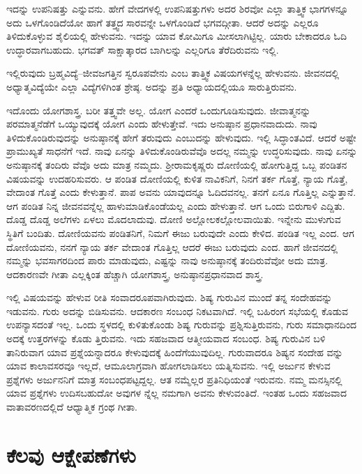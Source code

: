 ಇದನ್ನು ಉಪನಿಷತ್ತು ಎನ್ನುವನು. ಹೇಗೆ ವೇದಗಳಲ್ಲಿ ಉಪನಿಷತ್ತುಗಳು ಅದರ ಶಿರವೋ ಎಲ್ಲಾ ತಾತ್ತ್ವಿಕ ಭಾಗಗಳನ್ನೂ ಅದು ಒಳಗೊಂಡಿದೆಯೋ ಹಾಗೆ ತತ್ತ್ವದ ಸಾರವನ್ನೇ ಒಳಗೊಂಡಿದೆ ಭಗವದ್ಗೀತಾ. ಆದರೆ ಅದನ್ನು ಎಲ್ಲರೂ ತಿಳಿದುಕೊಳ್ಳುವ ಶೈಲಿಯಲ್ಲಿ ಹೇಳುವನು. ಇದನ್ನು ಯಾವ ಕೋಮಿಗೂ ಮೀಸಲಾಗಿಟ್ಟಿಲ್ಲ. ಯಾರು ಬೇಕಾದರೂ ಓದಿ ಉದ್ಧಾರವಾಗಬಹುದು. ಭಗವತ್ ಸಾಕ್ಷಾತ್ಕಾರದ ಬಾಗಿಲನ್ನು ಎಲ್ಲರಿಗೂ ತೆರೆದಿರುವನು ಇಲ್ಲಿ.

ಇಲ್ಲಿರುವುದು ಬ್ರಹ್ಮವಿದ್ಯೆ–ಜೀವಜಗತ್ತಿನ ಸ್ವರೂಪವೇನು ಎಂಬ ತಾತ್ತ್ವಿಕ ವಿಷಯಗಳನ್ನೆಲ್ಲ ಹೇಳುವನು. ಜೀವನದಲ್ಲಿ ಅಧ್ಯಾತ್ಮವಿದ್ಯೆಯೇ ಎಲ್ಲಾ ವಿದ್ಯೆಗಳಿಗಿಂತ ಶ್ರೇಷ್ಠ. ಅದನ್ನು ಪ್ರತಿ ಅಧ್ಯಾಯದಲ್ಲಿಯೂ ಸಾರುತ್ತಿರುವನು.

ಇದೊಂದು ಯೋಗಶಾಸ್ತ್ರ. ಬರೀ ತತ್ತ್ವವೇ ಅಲ್ಲ. ಯೋಗ ಎಂದರೆ ಒಂದುಗೂಡಿಸುವುದು. ಜೀವಾತ್ಮನನ್ನು ಪರಮಾತ್ಮನೆಡೆಗೆ ಒಯ್ಯುವುದಕ್ಕೆ ಯೋಗ ಎಂದು ಹೇಳುತ್ತೇವೆ. ಇದು ಅನುಷ್ಠಾನ ಪ್ರಧಾನವಾದುದು. ನಾವು ತಿಳಿದುಕೊಂಡಿರುವುದನ್ನು ಅನುಷ್ಠಾನಕ್ಕೆ ಹೇಗೆ ತರುವುದು ಎಂಬುದನ್ನು ಹೇಳುವುದು. ಇಲ್ಲಿ ಸಿದ್ಧಾಂತವಿದೆ. ಆದರೆ ಅಷ್ಟೇ ಪ್ರಾಮುಖ್ಯತೆ ಸಾಧನೆಗೆ ಇದೆ. ನಾವು ಏನನ್ನು ತಿಳಿದುಕೊಂಡಿರುವೆವೊ ಅದಲ್ಲ ನಮ್ಮನ್ನು ಉದ್ಧರಿಸುವುದು. ನಾವು ಏನನ್ನು ಅನುಷ್ಠಾನಕ್ಕೆ ತಂದಿರು ವೆವೊ ಅದು ಮಾತ್ರ ನಮ್ಮದು. ಶ್ರೀರಾಮಕೃಷ್ಣರು ದೋಣಿಯಲ್ಲಿ ಹೋಗುತ್ತಿದ್ದ ಒಬ್ಬ ಪಂಡಿತನ ವಿಷಯವನ್ನು ಉದಹರಿಸುವರು. ಆ ಪಂಡಿತ ದೋಣಿಯಲ್ಲಿ ಕುಳಿತ ನಾವಿಕನಿಗೆ, ನಿನಗೆ ತರ್ಕ ಗೊತ್ತೆ, ನ್ಯಾಯ ಗೊತ್ತೆ, ವೇದಾಂತ ಗೊತ್ತೆ ಎಂದು ಕೇಳುತ್ತಾನೆ. ಪಾಪ ಅವನು ಯಾವುದನ್ನೂ ಓದಿದವನಲ್ಲ. ತನಗೆ ಏನೂ ಗೊತ್ತಿಲ್ಲ ಎನ್ನುತ್ತಾನೆ. ಆಗ ಪಂಡಿತ ನಿನ್ನ ಜೀವನವನ್ನೆಲ್ಲ ಹಾಳುಮಾಡಿಕೊಂಡೆಯಲ್ಲ ಎಂದು ಹೇಳುತ್ತಾನೆ. ಆಗ ಒಂದು ಬಿರುಗಾಳಿ ಎದ್ದಿತು. ದೊಡ್ಡ ದೊಡ್ಡ ಅಲೆಗಳು ಏಳಲು ಮೊದಲಾದುವು. ದೋಣಿ ಅಲ್ಲೋಲಕಲ್ಲೋಲವಾಯಿತು. ಇನ್ನೇನು ಮುಳುಗುವ ಸ್ಥಿತಿಗೆ ಬಂದಿತು. ದೋಣಿಯವನು ಪಂಡಿತನಿಗೆ, ನಿಮಗೆ ಈಜು ಬರುವುದೇ ಎಂದು ಕೇಳಿದ. ಪಂಡಿತ ಇಲ್ಲ ಎಂದ. ಆಗ ದೋಣಿಯವನು, ನನಗೆ ನ್ಯಾಯ ತರ್ಕ ವೇದಾಂತ ಗೊತ್ತಿಲ್ಲ ಆದರೆ ಈಜು ಬರುವುದು ಎಂದ. ಹಾಗೆ ಜೀವನದಲ್ಲಿ ನಮ್ಮನ್ನು ಭವಸಾಗರದಿಂದ ಪಾರು ಮಾಡುವುದು, ಎಷ್ಟನ್ನು ನಾವು ಅನುಷ್ಠಾನಕ್ಕೆ ತಂದಿರುವೆವೋ ಅದು ಮಾತ್ರ. ಆದಕಾರಣವೇ ಗೀತಾ ಎಲ್ಲಕ್ಕಿಂತ ಹೆಚ್ಚಾಗಿ ಯೋಗಶಾಸ್ತ್ರ, ಅನುಷ್ಠಾನಪ್ರಧಾನವಾದ ಶಾಸ್ತ್ರ.

ಇಲ್ಲಿ ವಿಷಯವನ್ನು ಹೇಳುವ ರೀತಿ ಸಂವಾದರೂಪವಾಗಿರುವುದು. ಶಿಷ್ಯ ಗುರುವಿನ ಮುಂದೆ ತನ್ನ ಸಂದೇಹವನ್ನು ಇಡುವನು. ಗುರು ಅದನ್ನು ಬಿಡಿಸುವನು. ಆದಕಾರಣ ಸಂಬಂಧ ನಿಕಟವಾಗಿದೆ. ಇಲ್ಲಿ ಬಹಿರಂಗ ಸಭೆಯಲ್ಲಿ ಕೊಡುವ ಉಪನ್ಯಾಸದಂತೆ ಇಲ್ಲ. ಒಂದು ಸ್ಥಳದಲ್ಲಿ ಕುಳಿತುಕೊಂಡು ಶಿಷ್ಯ ಗುರುವನ್ನು ಪ್ರಶ್ನಿಸುತ್ತಿರುವನು, ಗುರು ಸಮಾಧಾನದಿಂದ ಅದಕ್ಕೆ ಉತ್ತರಗಳನ್ನು ಕೊಡು ತ್ತಿರುವನು. ಇದು ಸಹಜವಾದ ಆತ್ಮೀಯವಾದ ಸಂಬಂಧ. ಶಿಷ್ಯ ಗುರುವಿನ ಬಳಿ ತಾನಿರುವಾಗ ಯಾವ ಪ್ರಶ್ನೆಯನ್ನಾದರೂ ಕೇಳುವುದಕ್ಕೆ ಹಿಂದೆಗೆಯುವುದಿಲ್ಲ. ಗುರುವಾದರೂ ಶಿಷ್ಯನ ಸಂದೇಹ ವನ್ನು ಯಾವ ಕಾಲಾವಸರವೂ ಇಲ್ಲದೆ, ಆಮೂಲಾಗ್ರವಾಗಿ ಹೋಗಲಾಡಿಸಲು ಯತ್ನಿಸುವನು. ಇಲ್ಲಿ ಅರ್ಜುನ ಕೇಳುವ ಪ್ರಶ್ನೆಗಳು ಅರ್ಜುನನಿಗೆ ಮಾತ್ರ ಸಂಬಂಧಪಟ್ಟದ್ದಲ್ಲ. ಆತ ನಮ್ಮೆಲ್ಲರ ಪ್ರತಿನಿಧಿಯಂತೆ ಇರುವನು. ನಮ್ಮ ಮನಸ್ಸಿನಲ್ಲಿ ಯಾವ ಪ್ರಶ್ನೆಗಳು ಉದಿಸಬಹುದೋ ಅವುಗಳ ನ್ನೆಲ್ಲ ನಮಗಾಗಿ ಅವನು ಕೇಳುವಂತಿದೆ. ಇಂತಹ ಒಂದು ಸಹಜವಾದ ವಾತಾವರಣದಲ್ಲಿದೆ ಆಧ್ಯಾತ್ಮಿಕ ಗ್ರಂಥ ಗೀತಾ.


\section*{ಕೆಲವು ಆಕ್ಷೇಪಣೆಗಳು}

